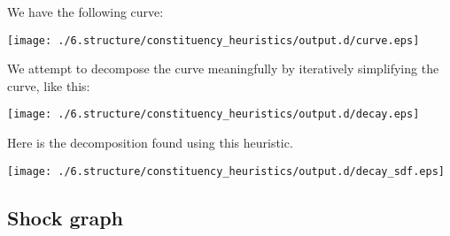\documentclass{book}
\begin{document}
We have the following curve:

\texttt{[image: ./6.structure/constituency\_heuristics/output.d/curve.eps]}

We attempt to decompose the curve meaningfully by iteratively
simplifying the curve, like this:

\texttt{[image: ./6.structure/constituency\_heuristics/output.d/decay.eps]}


Here is the decomposition found using this heuristic.

\texttt{[image: ./6.structure/constituency\_heuristics/output.d/decay\_sdf.eps]}
\subsection{Shock graph}
\label{sec-3_7_4}
\end{document}
